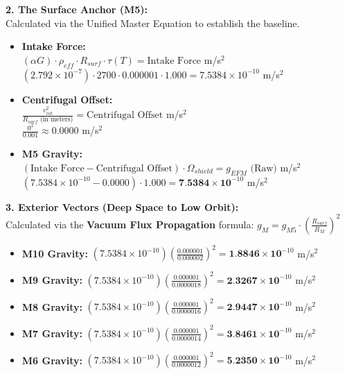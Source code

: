 \documentclass[11pt, a4paper]{article}
\begin{document}
  \vspace{1.0em}
  \noindent \textbf{2. The Surface Anchor (M5):} \\
  \hspace*{1em} Calculated via the Unified Master Equation to establish the baseline.
  \begin{itemize}
    \item \textbf{Intake Force:} \\[0.5em]
    \hspace*{2em} $(\alpha G) \cdot \rho_{eff} \cdot R_{surf} \cdot \tau(T) = \text{Intake Force}$ m/s$^2$ \\[1em]
    \hspace*{2em} $(2.792 \times 10^{-7}) \cdot 2700 \cdot 0.000001 \cdot 1.000 = 7.5384 \times 10^{-10}$ m/s$^2$
    
    \item \textbf{Centrifugal Offset:} \\[0.5em]
    \hspace*{2em} $\frac{v_{rot}^2}{R_{surf} \text{ (in meters)}} = \text{Centrifugal Offset}$ m/s$^2$ \\[1em]
    \hspace*{2em} $\frac{0^2}{0.001} \approx 0.0000$ m/s$^2$
    
    \item \textbf{M5 Gravity:} \\[0.5em]
    \hspace*{2em} $(\text{Intake Force} - \text{Centrifugal Offset}) \cdot \Omega_{shield} = g_{EFM} \text{ (Raw)}$ m/s$^2$ \\[1em]
    \hspace*{2em} $(7.5384 \times 10^{-10} - 0.0000) \cdot 1.000 = \textbf{7.5384} \times \textbf{10}^{-10}$ m/s$^2$
  \end{itemize}

  \clearpage
  \noindent \textbf{3. Exterior Vectors (Deep Space to Low Orbit):} \\
  \hspace*{1em} Calculated via the \textbf{Vacuum Flux Propagation} formula: $g_M = g_{M5} \cdot \left( \frac{R_{surf}}{R_M} \right)^2$
  \begin{itemize}
    \item \textbf{M10 Gravity:} $(7.5384 \times 10^{-10}) \left( \frac{0.000001}{0.000002} \right)^2 = \textbf{1.8846} \times \textbf{10}^{-10}$ m/s$^2$
    \item \textbf{M9 Gravity:} $(7.5384 \times 10^{-10}) \left( \frac{0.000001}{0.0000018} \right)^2 = \textbf{2.3267} \times \textbf{10}^{-10}$ m/s$^2$
    \item \textbf{M8 Gravity:} $(7.5384 \times 10^{-10}) \left( \frac{0.000001}{0.0000016} \right)^2 = \textbf{2.9447} \times \textbf{10}^{-10}$ m/s$^2$
    \item \textbf{M7 Gravity:} $(7.5384 \times 10^{-10}) \left( \frac{0.000001}{0.0000014} \right)^2 = \textbf{3.8461} \times \textbf{10}^{-10}$ m/s$^2$
    \item \textbf{M6 Gravity:} $(7.5384 \times 10^{-10}) \left( \frac{0.000001}{0.0000012} \right)^2 = \textbf{5.2350} \times \textbf{10}^{-10}$ m/s$^2$
  \end{itemize}
\end{document}
